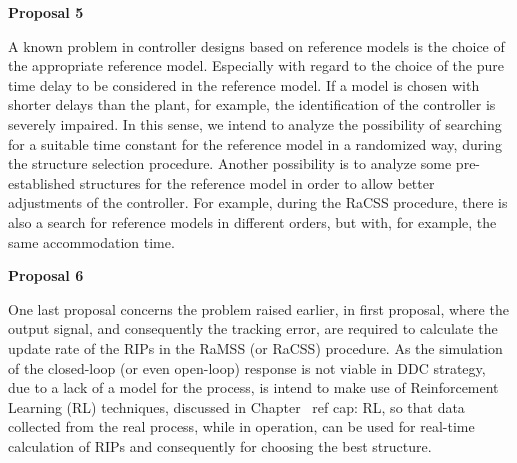 \medskip
\textbf{Proposal 5} 

A known problem in controller designs based on reference models is the choice of the appropriate reference model. Especially with regard to the choice of the pure time delay to be considered in the reference model. If a model is chosen with shorter delays than the plant, for example, the identification of the controller is severely impaired. In this sense, we intend to analyze the possibility of searching for a suitable time constant for the reference model in a randomized way, during the structure selection procedure.
Another possibility is to analyze some pre-established structures for the reference model in order to allow better adjustments of the controller. For example, during the RaCSS procedure, there is also a search for reference models in different orders, but with, for example, the same accommodation time.

\medskip
\textbf{Proposal 6} 

One last proposal concerns the problem raised earlier, in first proposal, where the output signal, and consequently the tracking error, are required to calculate the update rate of the RIPs in the RaMSS (or RaCSS) procedure.
As the simulation of the closed-loop (or even open-loop) response is not viable in DDC strategy, due to a lack of a model for the process, is intend to make use of Reinforcement Learning (RL) techniques, 
discussed in Chapter \ ref {cap: RL},
so that data collected from the real process, while in operation, can be used for real-time calculation of RIPs and consequently for choosing the best structure.

